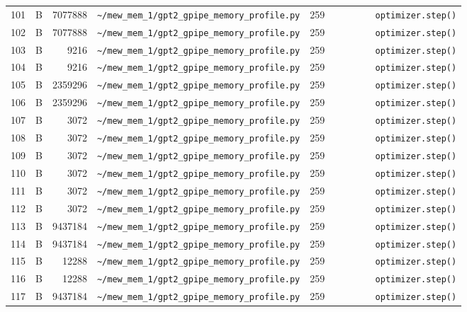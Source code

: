 \documentclass{article}
\begin{document}
\begin{longtable}{r l r p{6.5cm} r p{7.0cm}}
101 & B & 7077888 & \lstinline|~/mew_mem_1/gpt2_gpipe_memory_profile.py| & 259 & \lstinline|        optimizer.step()| \\
102 & B & 7077888 & \lstinline|~/mew_mem_1/gpt2_gpipe_memory_profile.py| & 259 & \lstinline|        optimizer.step()| \\
103 & B & 9216 & \lstinline|~/mew_mem_1/gpt2_gpipe_memory_profile.py| & 259 & \lstinline|        optimizer.step()| \\
104 & B & 9216 & \lstinline|~/mew_mem_1/gpt2_gpipe_memory_profile.py| & 259 & \lstinline|        optimizer.step()| \\
105 & B & 2359296 & \lstinline|~/mew_mem_1/gpt2_gpipe_memory_profile.py| & 259 & \lstinline|        optimizer.step()| \\
106 & B & 2359296 & \lstinline|~/mew_mem_1/gpt2_gpipe_memory_profile.py| & 259 & \lstinline|        optimizer.step()| \\
107 & B & 3072 & \lstinline|~/mew_mem_1/gpt2_gpipe_memory_profile.py| & 259 & \lstinline|        optimizer.step()| \\
108 & B & 3072 & \lstinline|~/mew_mem_1/gpt2_gpipe_memory_profile.py| & 259 & \lstinline|        optimizer.step()| \\
109 & B & 3072 & \lstinline|~/mew_mem_1/gpt2_gpipe_memory_profile.py| & 259 & \lstinline|        optimizer.step()| \\
110 & B & 3072 & \lstinline|~/mew_mem_1/gpt2_gpipe_memory_profile.py| & 259 & \lstinline|        optimizer.step()| \\
111 & B & 3072 & \lstinline|~/mew_mem_1/gpt2_gpipe_memory_profile.py| & 259 & \lstinline|        optimizer.step()| \\
112 & B & 3072 & \lstinline|~/mew_mem_1/gpt2_gpipe_memory_profile.py| & 259 & \lstinline|        optimizer.step()| \\
113 & B & 9437184 & \lstinline|~/mew_mem_1/gpt2_gpipe_memory_profile.py| & 259 & \lstinline|        optimizer.step()| \\
114 & B & 9437184 & \lstinline|~/mew_mem_1/gpt2_gpipe_memory_profile.py| & 259 & \lstinline|        optimizer.step()| \\
115 & B & 12288 & \lstinline|~/mew_mem_1/gpt2_gpipe_memory_profile.py| & 259 & \lstinline|        optimizer.step()| \\
116 & B & 12288 & \lstinline|~/mew_mem_1/gpt2_gpipe_memory_profile.py| & 259 & \lstinline|        optimizer.step()| \\
117 & B & 9437184 & \lstinline|~/mew_mem_1/gpt2_gpipe_memory_profile.py| & 259 & \lstinline|        optimizer.step()| \\

\end{longtable}
\end{document}

